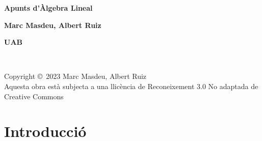 \documentclass[
  11pt,
]{book}
\makeatletter
\renewcommand{\cleardoublepage}{
\clearpage\ifodd\c@page\else
\hbox{}
\vspace*{\fill}
\thispagestyle{empty}
\newpage
\fi}
\numberwithin{dummy}{section}
\theoremstyle{maincolornumbox}
\theoremstyle{blacknumex}
\theoremstyle{blacknumbox}
\theoremstyle{maincolornum}
\newlength\esp
\newif\ifusechapterimage
\makeatother
\begin{document}
	{ %

		\centering\sffamily %
		\par
		\vspace{10pt}
		\par
		{\Huge\bfseries Apunts d'Àlgebra Lineal\par} %
		\vspace{16pt} %
		{\LARGE\bfseries Marc Masdeu, Albert Ruiz\par} %
		\vspace{20pt} %
		{\LARGE\bfseries UAB\par}
	}



\newpage
~\vfill
\thispagestyle{empty}

\noindent Copyright \copyright\ 2023 Marc Masdeu, Albert Ruiz\\ %



\noindent Aquesta obra està subjecta a una llicència de Reconeixement 3.0 No adaptada de Creative Commons



\usechapterimagefalse %

\pagestyle{empty} %


\tableofcontents %

\cleardoublepage %

\pagestyle{fancy} %

\chapter*{Introducció}\label{introducciuxf3}
\end{document}
